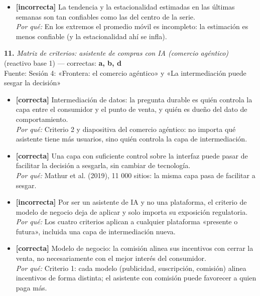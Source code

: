 \documentclass[10pt,letterpaper]{article}
\begin{document}
{\begin{itemize}[leftmargin=1.2em,itemsep=0pt,topsep=1pt,parsep=0pt]
\item[\textbf{d)}] {\footnotesize \textbf{[incorrecta]} La tendencia y la estacionalidad estimadas en las últimas semanas son tan confiables como las del centro de la serie.\\ \textit{Por qué:} En los extremos el promedio móvil es incompleto: la estimación es menos confiable (y la estacionalidad ahí se infla).}
\end{itemize}
\vspace{3pt}\noindent\textbf{11.} \textit{Matriz de criterios: asistente de compras con IA (comercio agéntico)} (reactivo base 1) — correctas: \textbf{a, b, d}\\[-1pt]
{\scriptsize Fuente: Sesión 4: «Frontera: el comercio agéntico» y «La intermediación puede sesgar la decisión»}
\begin{itemize}[leftmargin=1.2em,itemsep=0pt,topsep=1pt,parsep=0pt]
\item[\textbf{a)}] {\footnotesize \textbf{[correcta]} Intermediación de datos: la pregunta durable es quién controla la capa entre el consumidor y el punto de venta, y quién es dueño del dato de comportamiento.\\ \textit{Por qué:} Criterio 2 y diapositiva del comercio agéntico: no importa qué asistente tiene más usuarios, sino quién controla la capa de intermediación.}
\item[\textbf{b)}] {\footnotesize \textbf{[correcta]} Una capa con suficiente control sobre la interfaz puede pasar de facilitar la decisión a sesgarla, sin cambiar de tecnología.\\ \textit{Por qué:} Mathur et al. (2019), 11 000 sitios: la misma capa pasa de facilitar a sesgar.}
\item[\textbf{c)}] {\footnotesize \textbf{[incorrecta]} Por ser un asistente de IA y no una plataforma, el criterio de modelo de negocio deja de aplicar y solo importa su exposición regulatoria.\\ \textit{Por qué:} Los cuatro criterios aplican a cualquier plataforma «presente o futura», incluida una capa de intermediación nueva.}
\item[\textbf{d)}] {\footnotesize \textbf{[correcta]} Modelo de negocio: la comisión alinea sus incentivos con cerrar la venta, no necesariamente con el mejor interés del consumidor.\\ \textit{Por qué:} Criterio 1: cada modelo (publicidad, suscripción, comisión) alinea incentivos de forma distinta; el asistente con comisión puede favorecer a quien paga más.}
\end{itemize}
}
\end{document}
